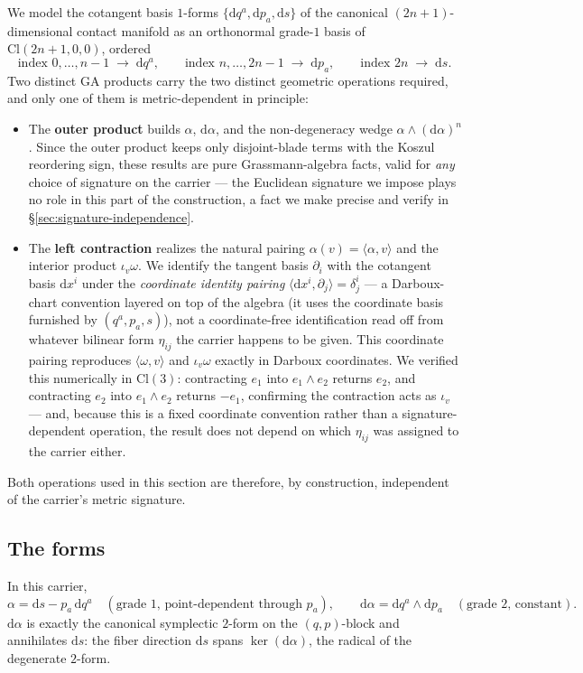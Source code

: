 \documentclass[11pt]{article}
\newcommand{\Cl}{\mathrm{Cl}}
\newcommand{\dif}{\mathrm{d}}
\begin{document}
We model the cotangent basis $1$-forms $\{\dif q^a, \dif p_a, \dif s\}$ of the canonical $(2n+1)$-dimensional contact manifold as an orthonormal grade-$1$ basis of $\Cl(2n+1,0,0)$, ordered
\[
\text{index } 0,\dots,n{-}1 \;\to\; \dif q^a, \qquad
\text{index } n,\dots,2n{-}1 \;\to\; \dif p_a, \qquad
\text{index } 2n \;\to\; \dif s .
\]
Two distinct GA products carry the two distinct geometric operations required, and only one of them is metric-dependent in principle:
\begin{itemize}[leftmargin=1.4em]
\item The \textbf{outer product} builds $\alpha$, $\dif\alpha$, and the non-degeneracy wedge $\alpha\wedge(\dif\alpha)^n$. Since the outer product keeps only disjoint-blade terms with the Koszul reordering sign, these results are pure Grassmann-algebra facts, valid for \emph{any} choice of signature on the carrier — the Euclidean signature we impose plays no role in this part of the construction, a fact we make precise and verify in \S\ref{sec:signature-independence}.
\item The \textbf{left contraction} realizes the natural pairing $\alpha(v) = \langle\alpha,v\rangle$ and the interior product $\iota_v\omega$. We identify the tangent basis $\partial_i$ with the cotangent basis $\dif x^i$ under the \emph{coordinate identity pairing} $\langle \dif x^i, \partial_j\rangle = \delta^i_j$ — a Darboux-chart convention layered on top of the algebra (it uses the coordinate basis furnished by $(q^a,p_a,s)$), not a coordinate-free identification read off from whatever bilinear form $\eta_{ij}$ the carrier happens to be given. This coordinate pairing reproduces $\langle\omega,v\rangle$ and $\iota_v\omega$ exactly in Darboux coordinates. We verified this numerically in $\Cl(3)$: contracting $e_1$ into $e_1\wedge e_2$ returns $e_2$, and contracting $e_2$ into $e_1\wedge e_2$ returns $-e_1$, confirming the contraction acts as $\iota_v$ — and, because this is a fixed coordinate convention rather than a signature-dependent operation, the result does not depend on which $\eta_{ij}$ was assigned to the carrier either.
\end{itemize}
Both operations used in this section are therefore, by construction, independent of the carrier's metric signature.

\subsection{The forms}

In this carrier,
\begin{equation}
\alpha = \dif s - p_a\,\dif q^a \quad(\text{grade 1, point-dependent through }p_a),\qquad
\dif\alpha = \dif q^a\wedge \dif p_a \quad (\text{grade 2, constant}).
\label{eq:forms}
\end{equation}
$\dif\alpha$ is exactly the canonical symplectic $2$-form on the $(q,p)$-block and annihilates $\dif s$: the fiber direction $\dif s$ spans $\ker(\dif\alpha)$, the radical of the degenerate $2$-form.
\end{document}
